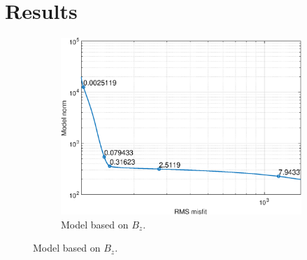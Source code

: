 \section{Results}

\begin{figure}[ht]
    \centering
    \begin{subfigure}[b]{0.45\textwidth}
        \includegraphics[width=\textwidth]{fig/LCurveBz.eps}
        \caption{Model based on $B_z$.}
        \label{fig:LCurveBz}
    \end{subfigure}
    

\end{figure}
